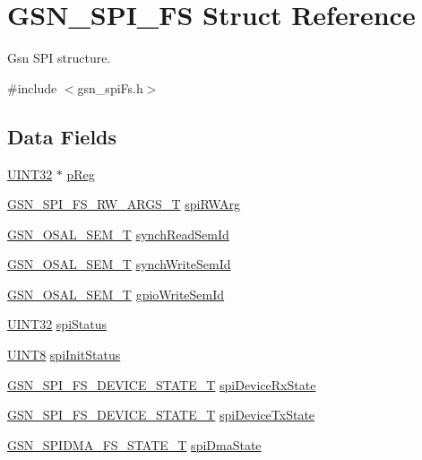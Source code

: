 \hypertarget{a00232}{
\section{GSN\_\-SPI\_\-FS Struct Reference}
\label{a00232}
}


Gsn SPI structure.  




{\ttfamily \#include $<$gsn\_\-spiFs.h$>$}

\subsection*{Data Fields}
\begin{DoxyCompactItemize}
\item 
\hyperlink{a00660_gae1e6edbbc26d6fbc71a90190d0266018}{UINT32} $\ast$ \hyperlink{a00232_a8843236297383a79c5da2bbddfcee223}{pReg}
\item 
\hyperlink{a00235}{GSN\_\-SPI\_\-FS\_\-RW\_\-ARGS\_\-T} \hyperlink{a00232_ae5d2dc9000a0a784dfad8020cc9bd8a5}{spiRWArg}
\item 
\hyperlink{a00628_gab4b3554407ce22b940e2fcd3faf5fd47}{GSN\_\-OSAL\_\-SEM\_\-T} \hyperlink{a00232_a0ae46c6bc8db30c9e5f95b0db8291410}{synchReadSemId}
\item 
\hyperlink{a00628_gab4b3554407ce22b940e2fcd3faf5fd47}{GSN\_\-OSAL\_\-SEM\_\-T} \hyperlink{a00232_ae01fab2e8492394ab72da071913c49fd}{synchWriteSemId}
\item 
\hyperlink{a00628_gab4b3554407ce22b940e2fcd3faf5fd47}{GSN\_\-OSAL\_\-SEM\_\-T} \hyperlink{a00232_ac0d7eb72a3873cada0b3fa697b2782b9}{gpioWriteSemId}
\item 
\hyperlink{a00660_gae1e6edbbc26d6fbc71a90190d0266018}{UINT32} \hyperlink{a00232_a8d5ce5c67020a6ef8da05f58f4593c0e}{spiStatus}
\item 
\hyperlink{a00660_gab27e9918b538ce9d8ca692479b375b6a}{UINT8} \hyperlink{a00232_a37e30f5b408d31bdf077d448268cee43}{spiInitStatus}
\item 
\hyperlink{a00589_af40dc8c688ceb473bbc35eec5c025295}{GSN\_\-SPI\_\-FS\_\-DEVICE\_\-STATE\_\-T} \hyperlink{a00232_a219d771e0676f3ba6fa87f91ee7f9970}{spiDeviceRxState}
\item 
\hyperlink{a00589_af40dc8c688ceb473bbc35eec5c025295}{GSN\_\-SPI\_\-FS\_\-DEVICE\_\-STATE\_\-T} \hyperlink{a00232_a9dd73e811fd5db3e9717c05a8446e413}{spiDeviceTxState}
\item 
\hyperlink{a00589_a48558d62f89ae3d03b1692979f55da06}{GSN\_\-SPIDMA\_\-FS\_\-STATE\_\-T} \hyperlink{a00232_a079845a76b6a4c460dbec830d1f753dd}{spiDmaState}

\end{DoxyCompactItemize}
